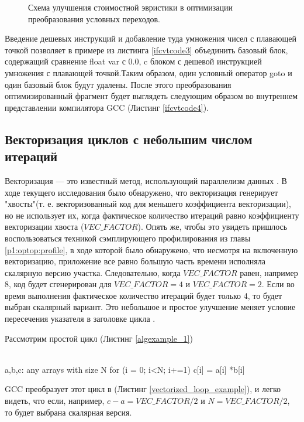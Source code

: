 \begin{figure}[htbp]
	\centering
	
	\caption{Схема улучшения стоимостной эвристики в оптимизации преобразования условных переходов.}
	\label{ifcvt2svg1}
\end{figure}

Введение дешевых инструкций и добавление туда умножения чисел с плавающей точкой позволяет в примере из листинга \ref{ifcvtcode3} объединить  базовый блок, содержащий сравнение float var с 0.0, c блоком с дешевой инструкцией умножения с плавающей точкой.Таким образом, один условный оператор goto и один базовый блок будут удалены. После этого преобразования оптимизированный фрагмент будет выглядеть следующим образом во внутреннем представлении компилятора GCC (Листинг \ref{ifcvtcode4}).

\subsection {Векторизация циклов с небольшим числом итераций}
Векторизация — это известный метод, использующий параллелизм данных \cite{nuzman2006autovectorization}. В ходе текущего исследования было обнаружено, что векторизация генерирует "хвосты"\phantom{ }(т. е. векторизованный код для меньшего коэффициента векторизации), но не использует их, когда фактическое количество итераций равно коэффициенту векторизации хвоста ($VEC\_FACTOR$). Опять же, чтобы это увидеть пришлось воспользоваться техникой сэмплирующего профилирования из главы \ref{p1:optop:profile}, в ходе которой было обнаружено, что несмотря на включенную векторизацию, приложение все равно большую часть времени исполняла скалярную версию участка. Следовательно, когда $VEC\_FACTOR$ равен, например 8, код будет сгенерирован для $VEC\_FACTOR = 4$ и $VEC\_FACTOR = 2$. Если во время выполнения фактическое количество итераций будет только 4, то будет выбран скалярный вариант. Это небольшое и простое улучшение меняет условие пересечения указателя в заголовке цикла \cite{E240105}.

Рассмотрим простой цикл (Листинг \ref{algexample_1})

\begin{ListingEnv}[!h]
	\captiondelim{ } %
	\caption{Простой цикл рассматриваемый оптимизацией векторизации.}\label{algexample_1}
	\begin{Verb}
		\\ a,b,c: any arrays with size N
		for (i = 0; i<N; i+=1)
		    c[i] = a[i] *b[i]
	\end{Verb}
\end{ListingEnv}
GCC преобразует этот цикл в (Листинг \ref{vectorized_loop_example}), и легко видеть, что если, например, $c-a = VEC\_FACTOR/2$ и $N = VEC\_FACTOR/2$, то будет выбрана скалярная версия.

